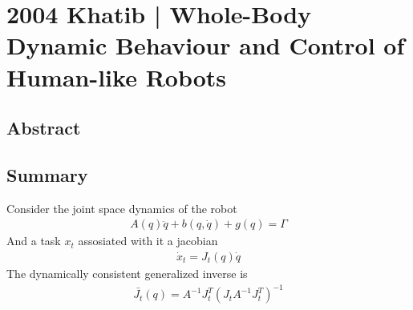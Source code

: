 \section{2004 Khatib | Whole-Body Dynamic Behaviour and Control of Human-like Robots}

\cite{khatib2004} 

\subsection{Abstract}

\subsection{Summary}

Consider the joint space dynamics of the robot
\begin{align}
    A(q)\ddot q + b(q, \dot q) + g(q) = \Gamma
\end{align}
And a task $x_t$ assosiated with it a jacobian
\begin{align}
    \dot x_t = J_t(q)\dot q
\end{align}
The dynamically consistent generalized inverse \cite{khatib1987} is
\begin{align}
    \bar{J_t}(q) = A^{-1} J_t^T (J_t A^{-1} J_t^T)^{-1}
\end{align}

